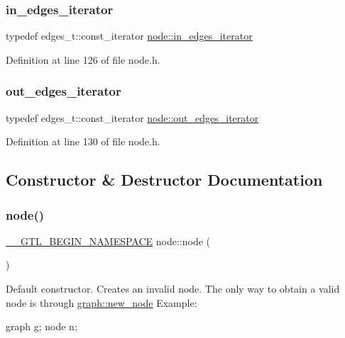 \subsubsection{\texorpdfstring{in\+\_\+edges\+\_\+iterator}{in\_edges\_iterator}}
{\footnotesize\ttfamily typedef edges\+\_\+t\+::const\+\_\+iterator \mbox{\hyperlink{classnode_a9a96be92add7c1a2771bcd0431ebf8ab}{node\+::in\+\_\+edges\+\_\+iterator}}}



Definition at line 126 of file node.\+h.

\mbox{\label{classnode_a90e17ed34de55072e8077f4367499a98}} 
\subsubsection{\texorpdfstring{out\+\_\+edges\+\_\+iterator}{out\_edges\_iterator}}
{\footnotesize\ttfamily typedef edges\+\_\+t\+::const\+\_\+iterator \mbox{\hyperlink{classnode_a90e17ed34de55072e8077f4367499a98}{node\+::out\+\_\+edges\+\_\+iterator}}}



Definition at line 130 of file node.\+h.



\subsection{Constructor \& Destructor Documentation}
\mbox{\label{classnode_a6da4ea35f222059db9a59cf40be459f9}} 
\subsubsection{\texorpdfstring{node()}{node()}}
{\footnotesize\ttfamily \mbox{\hyperlink{_g_t_l_8h_a2d9f24096ac60918452dd51f32b64aa9}{\+\_\+\+\_\+\+G\+T\+L\+\_\+\+B\+E\+G\+I\+N\+\_\+\+N\+A\+M\+E\+S\+P\+A\+CE}} node\+::node (\begin{DoxyParamCaption}{ }\end{DoxyParamCaption})}

Default constructor. Creates an invalid node. The only way to obtain a valid node is through \mbox{\hyperlink{classgraph_ab9505335c20558319b6cce25aed23524}{graph\+::new\+\_\+node}} Example\+: 
\begin{DoxyPre}
  graph g;
  node n;\end{DoxyPre}



